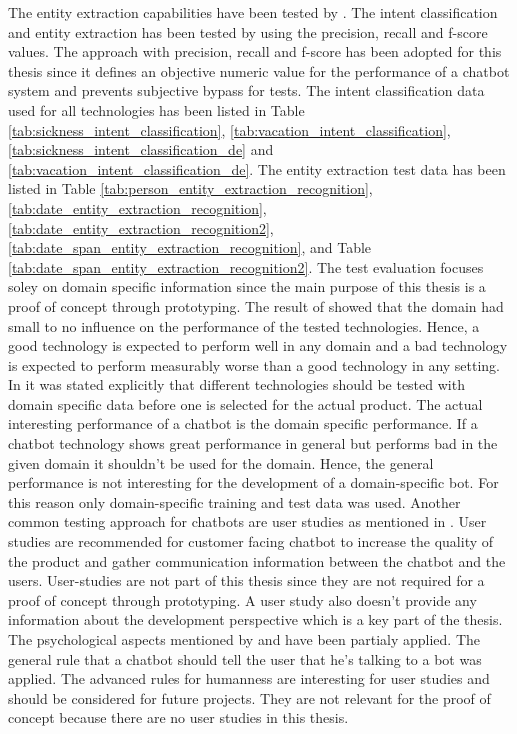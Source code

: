 The entity extraction capabilities have been tested by \citet{geyer2016named}.
The intent classification and entity extraction has been tested by \citet{braunEvaluatingNLU} 
using the precision, recall and f-score values.
The approach with precision, recall and f-score has been adopted for this thesis 
since it defines an objective numeric value for the performance of a chatbot system 
and prevents subjective bypass for tests.
The intent classification data used for all technologies has been listed in Table \ref{tab:sickness_intent_classification},
\ref{tab:vacation_intent_classification}, \ref{tab:sickness_intent_classification_de} and \ref{tab:vacation_intent_classification_de}.
The entity extraction test data has been listed in Table \ref{tab:person_entity_extraction_recognition}, 
\ref{tab:date_entity_extraction_recognition}, \ref{tab:date_entity_extraction_recognition2}, 
\ref{tab:date_span_entity_extraction_recognition}, and Table \ref{tab:date_span_entity_extraction_recognition2}.
The test evaluation focuses soley on domain specific information since the main purpose 
of this thesis is a proof of concept through prototyping.
The result of \citet{braunEvaluatingNLU} showed that the domain had small to no influence on the 
performance of the tested technologies.
Hence, a good technology is expected to perform well in any domain and a bad technology is expected
to perform measurably worse than a good technology in any setting.
In \citet{braunEvaluatingNLU} it was stated explicitly that different technologies should be tested 
with domain specific data before one is selected for the actual product.
The actual interesting performance of a chatbot is the domain specific performance.
If a chatbot technology shows great performance in general but performs bad in the 
given domain it shouldn't be used for the domain.
Hence, the general performance is not interesting for the development of a 
domain-specific bot.
For this reason only domain-specific training and test data was used.
Another common testing approach for chatbots are user studies as mentioned in \citet{evaluateChatbotsShawar2007}.
User studies are recommended for customer facing chatbot to increase the quality of the 
product and gather communication information between the chatbot and the users.
User-studies are not part of this thesis since they are not required for a proof of concept 
through prototyping.
A user study also doesn't provide any information about the development perspective which is 
a key part of the thesis.
The psychological aspects mentioned by \citet{folstad2017chatbots, brandtzaeg2018chatbots}
and \citet{GO2019304} have been partialy applied.
The general rule that a chatbot should tell the user that he's talking to a bot 
was applied.
The advanced rules for humanness are interesting for user studies and should be considered 
for future projects.
They are not relevant for the proof of concept because there are no user studies in this thesis.


